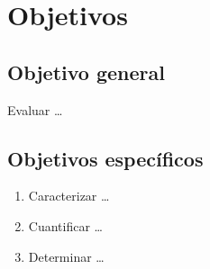 \section{Objetivos}

\subsection{Objetivo general}

Evaluar \dots

\subsection{Objetivos específicos}

\begin{enumerate}[label=\arabic*., leftmargin=*, itemsep=0.3\baselineskip]
  \item Caracterizar \dots
  \item Cuantificar \dots
  \item Determinar \dots
\end{enumerate}
